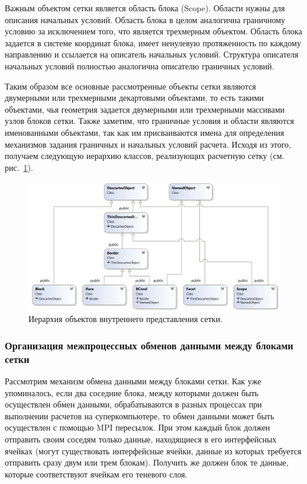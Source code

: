 Важным объектом сетки является область блока (Scope).
Области нужны для описания начальных условий.
Область блока в целом аналогична граничному условию за исключением того, что является трехмерным объектом.
Область блока задается в системе координат блока, имеет ненулевую протяженность по каждому направлению и ссылается на описатель начальных условий.
Структура описателя начальных условий полностью аналогична описателю граничных условий.

Таким образом все основные рассмотренные объекты сетки являются двумерными или трехмерными декартовыми объектами, то есть такими объектами, чья геометрия задается двумерными или трехмерными массивами узлов блоков сетки.
Также заметим, что граничные условия и области являются именованными объектами, так как им присваиваются имена для определения механизмов задания граничных и начальных условий расчета.
Исходя из этого, получаем следующую иерархию классов, реализующих расчетную сетку (см. рис.~\ref{fig:text_2_block_hierarchy}).

\begin{figure}[ht]
	\centering
	\includegraphics[width=1.0\textwidth]{./pics/text_2_block/9-hierarchy.png}
	\caption{Иерархия объектов внутреннего представления сетки.}
	\label{fig:text_2_block_hierarchy}
\end{figure}

\subsubsection{Организация межпроцессных обменов данными между блоками сетки}

Рассмотрим механизм обмена данными между блоками сетки.
Как уже упоминалось, если два соседние блока, между которыми должен быть осуществлен обмен данными, обрабатываются в разных процессах при выполнении расчетов на суперкомпьютере, то обмен данными может быть осуществлен с помощью MPI пересылок.
При этом каждый блок должен отправить своим соседям только данные, находящиеся в его интерфейсных ячейках (могут существовать интерфейсные ячейки, данные из которых требуется отправить сразу двум или трем блокам).
Получить же должен блок те данные, которые соответствуют ячейкам его теневого слоя.


